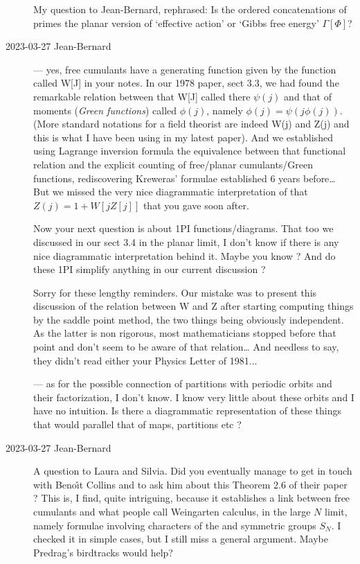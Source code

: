 \begin{description}
My question to Jean-Bernard, rephrased:
Is the ordered concatenations of primes the planar version of `effective
action' or `Gibbs free energy' $\Gamma[\Phi]$?

   \item[2023-03-27 Jean-Bernard]
— yes, free cumulants have a generating function given by the function
called W[J] in your notes. In our 1978 paper, sect 3.3, we
had found the remarkable relation between that W[J] called there $\psi(j)$
and that of moments ({\em Green functions})  called $\phi(j)$, namely
$\phi(j)=\psi(j \phi(j))$. (More standard notations for a field theorist are
indeed W(j) and Z(j) and this is what I have been using in my latest
paper). And we established using Lagrange inversion formula the
equivalence between  that functional relation and the explicit counting
of free/planar cumulants/Green functions, rediscovering Kreweras'
formulae established 6 years before… But we missed the very nice
diagrammatic interpretation of that $Z(j)=1+W[j Z[j]]$  that you gave
soon after.

Now your next question is about 1PI functions/diagrams. That too we
discussed in our sect 3.4 in the planar limit, I don't know if there is
any nice diagrammatic interpretation behind it. Maybe you know ? And do
these 1PI simplify anything in our current discussion ?

Sorry for these lengthy reminders. Our mistake was to present this
discussion of the relation between W and Z after starting computing
things by the saddle point method, the two things being obviously
independent. As the latter is non rigorous, most mathematicians stopped
before that point and don't seem to be aware of that relation… And
needless to say, they didn't read either your Physics Letter of 1981...

— as for the possible connection of partitions with periodic orbits and
their factorization, I don't know. I know very little about these orbits
and I have no intuition. Is there a diagrammatic representation of these
things that would parallel that of maps, partitions etc ?

   \item[2023-03-27 Jean-Bernard]
A question to Laura and Silvia. Did you eventually manage to get in touch
with Beno{\^{\i}}t Collins and to ask him about this Theorem 2.6 of their
paper ? This is, I find, quite intriguing,
because it establishes a link between free cumulants and what people call
Weingarten calculus, in the large $N$ limit, namely formulae involving
characters of the  and symmetric groups $S_N$. I checked it in
simple cases, but I still miss a general argument.
Maybe Predrag's birdtracks would help?


\end{description}
